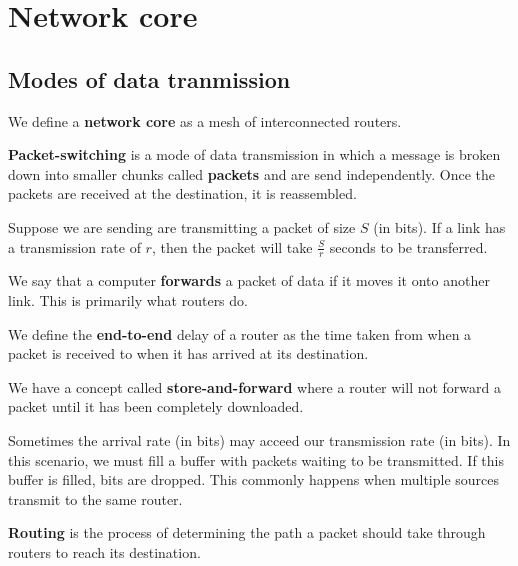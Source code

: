 \chapter{Network core}

\section{Modes of data tranmission}

\begin{definition}
    We define a \textbf{network core} as a mesh of interconnected routers.
\end{definition}

\begin{definition}
    \textbf{Packet-switching} is a mode of data transmission in which a message is broken down into smaller chunks called \textbf{packets} and are send independently. Once the packets are received at the destination, it is reassembled.
\end{definition}

Suppose we are sending are transmitting a packet of size $S$ (in bits). If a link has a transmission rate of $r$, then the packet will take $\frac{S}{r}$ seconds to be transferred.

We say that a computer \textbf{forwards} a packet of data if it moves it onto another link. This is primarily what routers do.

\begin{definition}
    We define the \textbf{end-to-end} delay of a router as the time taken from when a packet is received to when it has arrived at its destination.
\end{definition}

We have a concept called \textbf{store-and-forward} where a router will not forward a packet until it has been completely downloaded.

Sometimes the arrival rate (in bits) may acceed our transmission rate (in bits). In this scenario, we must fill a buffer with packets waiting to be transmitted. If this buffer is filled, bits are dropped. This commonly happens when multiple sources transmit to the same router.

\begin{definition}[Routing]
    \textbf{Routing} is the process of determining the path a packet should take through routers to reach its destination.
\end{definition}

